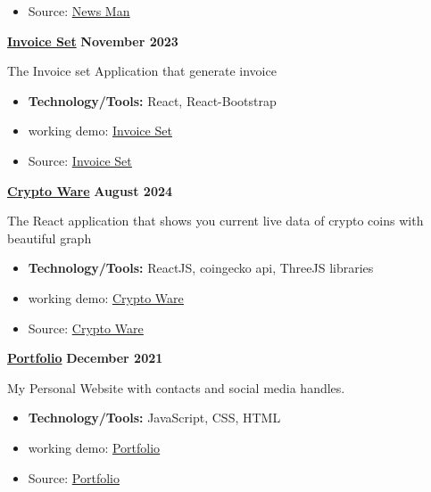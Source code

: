 \documentclass[letterpaper, 11pt]{article}
\newcommand{\bulletSpace}{\vspace{-8pt}}
\newcommand{\secEndSpace}{\vspace{5pt}}
\newcommand{\spaceCollapse}{\vspace{-5pt}}
\begin{document}
\begin{addmargin}[1em]{1em}
\begin{itemize}
		\item Source:  \href{https://github.com/sukhlotey/newsdaily}{\underline{News Man}}
	\end{itemize}
 \noindent\href{https://github.com/sukhlotey/invoice-set}{\textbf{Invoice Set}}  \hfill \textbf{November 2023} 
		
	\noindent The Invoice set Application that generate invoice
	\spaceCollapse
	\begin{itemize}
		\item \textbf{Technology/Tools:} React, React-Bootstrap
		      \bulletSpace
            	\item working demo:  \href{https://invoiceset.netlify.app/}
  {\underline{Invoice Set}}
		\item Source:  \href{https://github.com/sukhlotey/invoice-set}
  {\underline{Invoice Set}}
	\end{itemize}
	
 \newpage
	\noindent\href{https://github.com/sukhlotey/Crypto-Ware}{\textbf{Crypto Ware}}  \hfill \textbf{August 2024} 
		
	\noindent The React application that shows you current live data of crypto coins with beautiful graph
	\spaceCollapse
	\begin{itemize}
		\item \textbf{Technology/Tools:} ReactJS, coingecko api, ThreeJS libraries
		      \bulletSpace
		\item working demo:  \href{https://cryptowarehouse.netlify.app/}{\underline{Crypto Ware}}
           \item Source:  \href{https://github.com/sukhlotey/Crypto-Ware}{\underline{Crypto Ware}}
	\end{itemize}
	\noindent\href{https://github.com/sukhlotey/imSukhpreet}{\textbf{Portfolio}}  \hfill \textbf{December 2021} 
		
	\noindent My Personal Website with contacts and social media handles.
	\spaceCollapse
	\begin{itemize}
		\item \textbf{Technology/Tools:} JavaScript, CSS, HTML
		      \bulletSpace
		\item working demo:  \href{https://sukhlotey.github.io/imSukhpreet/}{\underline{Portfolio}}
           \item Source:  \href{https://github.com/sukhlotey/imSukhpreet}{\underline{Portfolio}}
	\end{itemize}
		
\end{addmargin}
\secEndSpace
\end{document}
